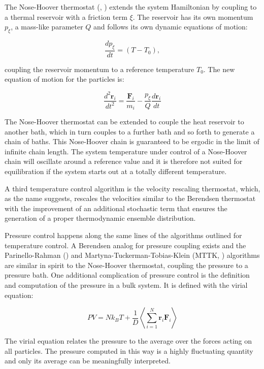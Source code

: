 \documentclass[english, a4paper, 12pt, titlepage, draft]{article}
\newcommand{\vect}[1]{\mathbf{#1}}
\begin{document}
The Nose-Hoover thermostat (\cite{Nose}, \cite{Hoover}) extends the system Hamiltonian by coupling to a thermal reservoir with a friction term $\xi$.
The reservoir has its own momentum $p_{\xi}$, a mass-like parameter $Q$ and follows its own dynamic equations of motion:

\begin{equation}
    \frac{dp_{\xi}}{dt} = (T-T_0),
\end{equation}

coupling the reservoir momentum to a reference temperature $T_0$.
The new equation of motion for the particles is:

\begin{equation}
    \frac{d^2\vect{r}_i}{dt^2} = \frac{\vect{F}_i}{m_i} - \frac{p_{\xi}}{Q} \frac{d\vect{r}_i}{dt}
\end{equation}

The Nose-Hoover thermostat can be extended to couple the heat reservoir to another bath, which in turn couples to a further bath and so forth to generate a chain of baths.
This Nose-Hoover chain is guaranteed to be ergodic in the limit of infinite chain length.
The system temperature under control of a Nose-Hoover chain will oscillate around a reference value and it is therefore not suited for equilibration if the system starts out at a totally different temperature.

A third temperature control algorithm is the velocity rescaling thermostat, which, as the name suggests, rescales the velocities similar to the Berendsen thermostat with the improvement of an additional stochastic term that ensures the generation of a proper thermodynamic ensemble distribution.

Pressure control happens along the same lines of the algorithms outlined for temperature control.
A Berendsen analog for pressure coupling exists and the Parinello-Rahman (\cite{ParrinelloRahman}) and Martyna-Tuckerman-Tobias-Klein (MTTK, \cite{MTTK}) algorithms are similar in spirit to the Nose-Hoover thermostat, coupling the pressure to a pressure bath.
One additional complication of pressure control is the definition and computation of the pressure in a bulk system.
It is defined with the virial equation:

\begin{equation}
    PV = Nk_BT + \frac{1}{D} \left< \sum^N_{i=1}\vect{r}_i \vect{F}_i \right>
\end{equation}

The virial equation relates the pressure to the average over the forces acting on all particles.
The pressure computed in this way is a highly fluctuating quantity and only its average can be meaningfully interpreted.
\end{document}
